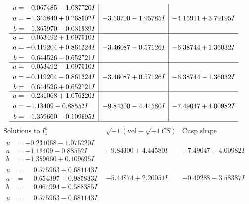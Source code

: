 \documentclass[1p]{elsarticle_modified}
\theoremstyle{definition}
\newcommand{\I}{\sqrt{-1}}
\begin{document}
$$\begin{array}{c|c|c}
\begin{aligned}
u &= \phantom{-}0.067485 - 1.087720 I \\
a &= -1.345840 + 0.268602 I \\
b &= -1.365970 - 0.031939 I\end{aligned}
 & -3.50700 - 1.95785 I & -4.15911 + 3.79195 I \\ \hline\begin{aligned}
u &= \phantom{-}0.053492 + 1.097010 I \\
a &= -0.119204 + 0.861224 I \\
b &= \phantom{-}0.644526 - 0.652721 I\end{aligned}
 & -3.46087 - 0.57126 I & -6.38744 + 1.36032 I \\ \hline\begin{aligned}
u &= \phantom{-}0.053492 - 1.097010 I \\
a &= -0.119204 - 0.861224 I \\
b &= \phantom{-}0.644526 + 0.652721 I\end{aligned}
 & -3.46087 + 0.57126 I & -6.38744 - 1.36032 I \\ \hline\begin{aligned}
u &= -0.231068 + 1.076220 I \\
a &= -1.18409 + 0.88552 I \\
b &= -1.359660 - 0.109695 I\end{aligned}
 & -9.84300 - 4.44580 I & -7.49047 + 4.00982 I\\
 \hline 
 \end{array}$$\newpage$$\begin{array}{c|c|c}  
\text{Solutions to }I^u_{1}& \I (\text{vol} + \sqrt{-1}CS) & \text{Cusp shape}\\
 \hline 
\begin{aligned}
u &= -0.231068 - 1.076220 I \\
a &= -1.18409 - 0.88552 I \\
b &= -1.359660 + 0.109695 I\end{aligned}
 & -9.84300 + 4.44580 I & -7.49047 - 4.00982 I \\ \hline\begin{aligned}
u &= \phantom{-}0.575963 + 0.681143 I \\
a &= \phantom{-}0.654397 + 0.985833 I \\
b &= \phantom{-}0.064994 - 0.588385 I\end{aligned}
 & -5.44874 + 2.20051 I & -0.49288 - 3.58387 I \\ \hline\begin{aligned}
u &= \phantom{-}0.575963 - 0.681143 I \\

\end{aligned}
\end{array}$$
\end{document}
